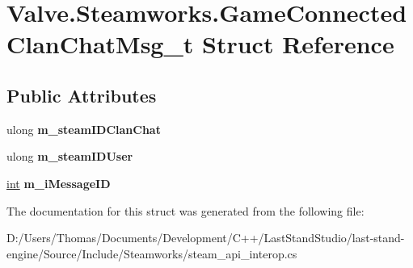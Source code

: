 \hypertarget{structValve_1_1Steamworks_1_1GameConnectedClanChatMsg__t}{}\section{Valve.\+Steamworks.\+Game\+Connected\+Clan\+Chat\+Msg\+\_\+t Struct Reference}
\label{structValve_1_1Steamworks_1_1GameConnectedClanChatMsg__t}
\subsection*{Public Attributes}
\begin{DoxyCompactItemize}
\item 
\hypertarget{structValve_1_1Steamworks_1_1GameConnectedClanChatMsg__t_a1de5a8189a177224f2e173475cd99c4c}{}ulong {\bfseries m\+\_\+steam\+I\+D\+Clan\+Chat}\label{structValve_1_1Steamworks_1_1GameConnectedClanChatMsg__t_a1de5a8189a177224f2e173475cd99c4c}

\item 
\hypertarget{structValve_1_1Steamworks_1_1GameConnectedClanChatMsg__t_a854496af4459d6f0ae2818152f2fe04c}{}ulong {\bfseries m\+\_\+steam\+I\+D\+User}\label{structValve_1_1Steamworks_1_1GameConnectedClanChatMsg__t_a854496af4459d6f0ae2818152f2fe04c}

\item 
\hypertarget{structValve_1_1Steamworks_1_1GameConnectedClanChatMsg__t_abe5c2938036649f04fea6a9689ba12ac}{}\hyperlink{SDL__thread_8h_a6a64f9be4433e4de6e2f2f548cf3c08e}{int} {\bfseries m\+\_\+i\+Message\+I\+D}\label{structValve_1_1Steamworks_1_1GameConnectedClanChatMsg__t_abe5c2938036649f04fea6a9689ba12ac}

\end{DoxyCompactItemize}


The documentation for this struct was generated from the following file\+:\begin{DoxyCompactItemize}
\item 
D\+:/\+Users/\+Thomas/\+Documents/\+Development/\+C++/\+Last\+Stand\+Studio/last-\/stand-\/engine/\+Source/\+Include/\+Steamworks/steam\+\_\+api\+\_\+interop.\+cs\end{DoxyCompactItemize}
